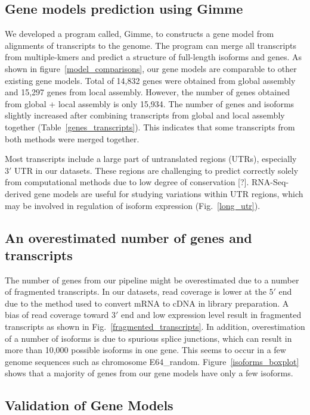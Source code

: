 \documentclass[10pt]{article}
\begin{document}
\subsection*{Gene models prediction using Gimme}

We developed a program called, Gimme, to constructs a gene model from alignments of transcripts to the genome.
The program can merge all transcripts from multiple-kmers and predict a structure of full-length isoforms and genes.
As shown in figure~\ref{model_comparisons}, our gene models are comparable to other existing gene models.
Total of 14,832 genes were obtained from global assembly and 15,297 genes from local assembly.
However, the number of genes obtained from global + local assembly is only 15,934.
The number of genes and isoforms slightly increased after combining transcripts from global and local
assembly together (Table~\ref{genes_transcripts}). 
This indicates that some transcripts from both methods were merged together.

Most transcripts include a large part of untranslated regions (UTRs), especially $3'$ UTR in our datasets.
These regions are challenging to predict correctly solely from computational methods due to low degree of conservation [?].
RNA-Seq-derived gene models are useful for studying variations within UTR regions, which may be involved in regulation of isoform expression\cite{} (Fig.~\ref{long_utr}).


\subsection*{An overestimated number of genes and transcripts}
The number of genes from our pipeline might be overestimated due to a number of fragmented transcripts.
In our datasets, read coverage is lower at the $5'$ end due to the method used to convert mRNA to cDNA
in library preparation.
A bias of read coverage toward $3'$ end and low expression level result in fragmented transcripts as shown in Fig.~\ref{fragmented_transcripts}.
In addition, overestimation of a number of isoforms is due to spurious splice junctions, which can result in more than 10,000 possible isoforms in one gene. This seems to occur in a few genome sequences such as chromosome E64\_random.
Figure~\ref{isoforms_boxplot} shows that a majority of genes from our gene models have only a few isoforms.

\subsection*{Validation of Gene Models}
\end{document}
